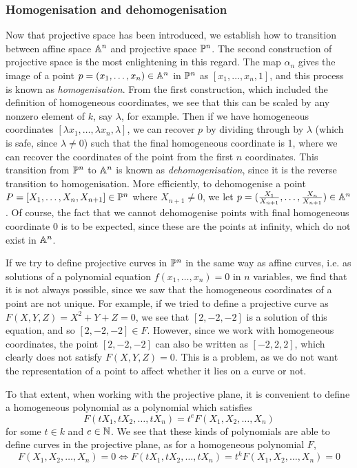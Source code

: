\subsubsection{Homogenisation and dehomogenisation}
Now that projective space has been introduced, we establish how to transition between affine space $\mathbb{A}^{n}$ and projective space $\mathbb{P}^{n}$.
The second construction of projective space is the most enlightening in this regard.
The map $\alpha_n$ gives the image of a point $p=(x_1,\ldots,x_n)\in\mathbb{A}^{n}$ in $\mathbb{P}^{n}$ as $[x_1,\ldots,x_n,1]$, and this process is known as \emph{homogenisation}.
From the first construction, which included the definition of homogeneous coordinates, we see that this can be scaled by any nonzero element of $k$, say $\lambda$, for example.
Then if we have homogeneous coordinates $[\lambda x_1,\ldots,\lambda x_n,\lambda]$, we can recover $p$ by dividing through by $\lambda$ (which is safe, since $\lambda\neq0$) such that the final homogeneous coordinate is 1, where we can recover the coordinates of the point from the first $n$ coordinates.
This transition from $\mathbb{P}^{n}$ to $\mathbb{A}^{n}$ is known as \emph{dehomogenisation}, since it is the reverse transition to homogenisation.
More efficiently, to dehomogenise a point $P = [X_1,\ldots,X_n,X_{n+1}] \in \mathbb{P}^{n}$ where $X_{n+1}\neq0$, we let $p = (\frac{X_1}{X_{n+1}},\ldots,\frac{X_n}{X_{n+1}})\in \mathbb{A}^{n}$.
Of course, the fact that we cannot dehomogenise points with final homogeneous coordinate 0 is to be expected, since these are the points at infinity, which do not exist in $\mathbb{A}^{n}$.

If we try to define projective curves in $\mathbb{P}^{n}$ in the same way as affine curves, i.e. as solutions of a polynomial equation $f(x_1,\ldots,x_n)=0$ in $n$ variables, we find that it is not always possible, since we saw that the homogeneous coordinates of a point are not unique.
For example, if we tried to define a projective curve as $F(X,Y,Z)=X^2+Y+Z=0$, we see that $[2,-2,-2]$ is a solution of this equation, and so $[2,-2,-2] \in F$.
However, since we work with homogeneous coordinates, the point $[2,-2,-2]$ can also be written as $[-2,2,2]$, which clearly does not satisfy $F(X,Y,Z)=0$.
This is a problem, as we do not want the representation of a point to affect whether it lies on a curve or not.

To that extent, when working with the projective plane, it is convenient to define a homogeneous polynomial as a polynomial which satisfies
$$F(tX_1,tX_2,\ldots,tX_n)=t^e F(X_1,X_2,\ldots,X_n)$$
for some $t \in k$ and $e \in \mathbb{N}$.
We see that these kinds of polynomials are able to define curves in the projective plane, as for a homogeneous polynomial $F$,
$$F(X_1,X_2,\ldots,X_n)=0 \Leftrightarrow F(tX_1,tX_2,\ldots,tX_n) = t^k F(X_1,X_2,\ldots,X_n) = 0$$


